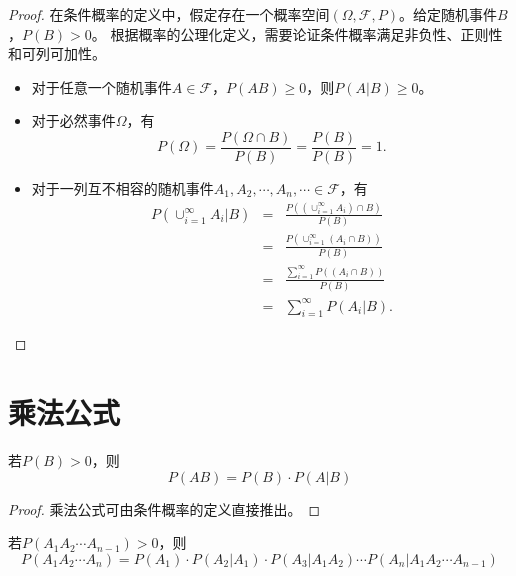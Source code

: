 \begin{proof}
    在条件概率的定义中，假定存在一个概率空间$(\Omega,\mathcal{F},P)$。给定随机事件$B$，$P(B)>0$。
根据概率的公理化定义，需要论证条件概率满足非负性、正则性和可列可加性。
\begin{itemize}
    \item 对于任意一个随机事件$A\in \mathcal{F}$，$P(AB)\geq 0$，则$P(A|B)\geq 0$。
    \item 对于必然事件$\Omega$，有
    $$
    P(\Omega ) = \frac{P(\Omega \cap B)}{P(B)} = \frac{P(B)}{P(B)} = 1.
    $$
    \item 对于一列互不相容的随机事件$A_1,A_2,\cdots,A_n,\cdots \in  \mathcal{F}$，有
    \begin{eqnarray*}
        P\left( \cup_{i=1}^{\infty} A_i | B\right) &=& \frac{P\left( \left(\cup_{i=1}^{\infty} A_i\right) \cap B \right)}{P(B)} \\
        &=& \frac{P\left( \cup_{i=1}^{\infty}\left( A_i \cap B \right)  \right)}{P(B)} \\
        &=& \frac{ \sum_{i=1}^{\infty} P\left(\left( A_i \cap B \right)  \right)}{P(B)} \\
        &=&  \sum_{i=1}^{\infty} P\left(A_i | B  \right) .
    \end{eqnarray*}
\end{itemize}
\end{proof}

\section{乘法公式}
\begin{theorem}[乘法公式] \label{thm: multiplication_theorem_of_probability} 
若$P(B)>0$，则$$P(AB)=P(B)\cdot P(A|B) $$
\end{theorem}
\begin{proof}
乘法公式可由条件概率的定义直接推出。
\end{proof}

\begin{corollary}
若$P(A_{1}A_{2}\cdots A_{n-1} )>0$，则$$P(A_{1}A_{2}\cdots A_{n} )=P(A_{1})\cdot P(A_{2}|A_{1})\cdot P(A_{3}|A_{1}A_{2})\cdots P(A_{n}|A_{1}A_{2}\cdots A_{n-1})$$
\end{corollary}

